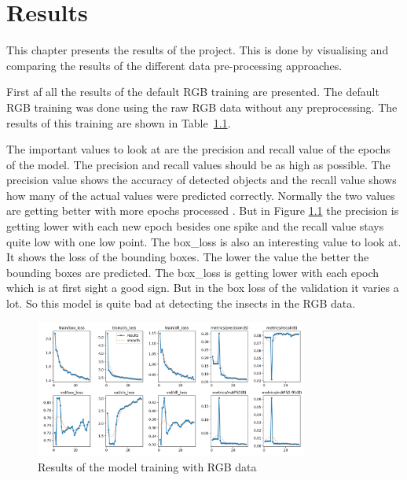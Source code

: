 \chapter{Results}
\label{ch:results}


This chapter presents the results of the project. This is done by visualising and comparing the results of the different data pre-processing approaches.

First af all the results of the default RGB training are presented. The default RGB training was done using the raw RGB data without any preprocessing. The results of this training are shown in Table~\ref{fig:results_rgb}.

The important values to look at are the precision and recall value of the epochs of the model. The precision and recall values should be as high as possible. The precision value shows the accuracy of detected objects and the recall value shows how many of the actual values were predicted correctly. Normally the two values are getting better with more epochs processed \citep{ultralyticsYOLOPerformance}. But in Figure \ref{fig:results_rgb} the precision is getting lower with each new epoch besides one spike and the recall value stays quite low with one low point.
The box\_loss is also an interesting value to look at. It shows the loss of the bounding boxes. The lower the value the better the bounding boxes are predicted. The box\_loss is getting lower with each epoch which is at first sight a good sign. But in the box loss of the validation it varies a lot. So this model is quite bad at detecting the insects in the RGB data.

\begin{figure}[htbp] 
    \centering
    \includegraphics[width=0.8\textwidth]{images/results/rgb_results.png}
    \caption{Results of the model training with RGB data}
    \label{fig:results_rgb}
\end{figure}

